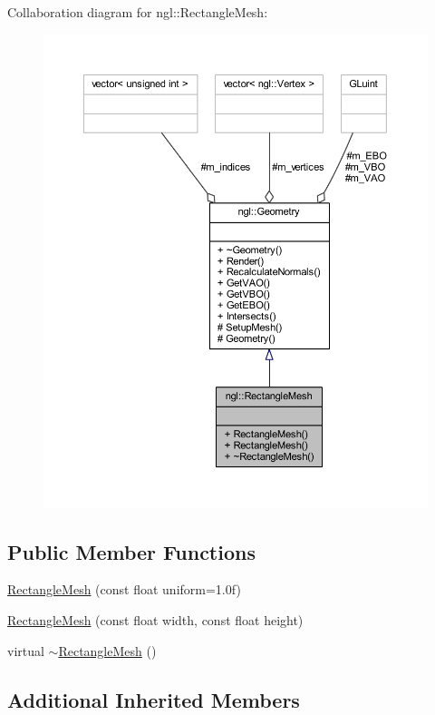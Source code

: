 Collaboration diagram for ngl\+:\+:Rectangle\+Mesh\+:
\nopagebreak
\begin{figure}[H]
\begin{center}
\leavevmode
\includegraphics[width=350pt]{classngl_1_1_rectangle_mesh__coll__graph}
\end{center}
\end{figure}
\subsection*{Public Member Functions}
\begin{DoxyCompactItemize}
\item 
\mbox{\hyperlink{classngl_1_1_rectangle_mesh_aa6f4990d6a7eea7055bceccb9259c882}{Rectangle\+Mesh}} (const float uniform=1.\+0f)
\item 
\mbox{\hyperlink{classngl_1_1_rectangle_mesh_a8a5f2c2968d7105930fea12608fe5b84}{Rectangle\+Mesh}} (const float width, const float height)
\item 
virtual \mbox{\hyperlink{classngl_1_1_rectangle_mesh_a3a6d4ae5fca0da03a2548d40cad8f26b}{$\sim$\+Rectangle\+Mesh}} ()
\end{DoxyCompactItemize}
\subsection*{Additional Inherited Members}


